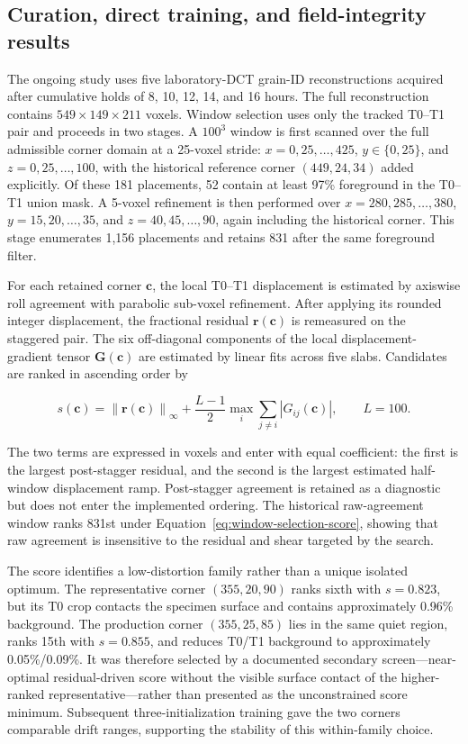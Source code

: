 \documentclass[proposalMode]{ufdissertation}
\begin{document}
\subsection{Curation, direct training, and field-integrity results}

The ongoing study uses five laboratory-DCT grain-ID reconstructions acquired after cumulative holds of 8, 10, 12, 14, and 16 hours. The full reconstruction contains \(549\times149\times211\) voxels. Window selection uses only the tracked T0--T1 pair and proceeds in two stages. A \(100^3\) window is first scanned over the full admissible corner domain at a 25-voxel stride: \(x=0,25,\ldots,425\), \(y\in\{0,25\}\), and \(z=0,25,\ldots,100\), with the historical reference corner \((449,24,34)\) added explicitly. Of these 181 placements, 52 contain at least 97\% foreground in the T0--T1 union mask. A 5-voxel refinement is then performed over \(x=280,285,\ldots,380\), \(y=15,20,\ldots,35\), and \(z=40,45,\ldots,90\), again including the historical corner. This stage enumerates 1,156 placements and retains 831 after the same foreground filter.

For each retained corner \(\mathbf{c}\), the local T0--T1 displacement is estimated by axiswise roll agreement with parabolic sub-voxel refinement. After applying its rounded integer displacement, the fractional residual \(\mathbf{r}(\mathbf{c})\) is remeasured on the staggered pair. The six off-diagonal components of the local displacement-gradient tensor \(\mathbf{G}(\mathbf{c})\) are estimated by linear fits across five slabs. Candidates are ranked in ascending order by

\begin{equation}
s(\mathbf{c})
=
\left\|\mathbf{r}(\mathbf{c})\right\|_{\infty}
+
\frac{L-1}{2}
\max_i\sum_{j\ne i}\left|G_{ij}(\mathbf{c})\right|,
\qquad L=100.
\label{eq:window-selection-score}
\end{equation}

The two terms are expressed in voxels and enter with equal coefficient: the first is the largest post-stagger residual, and the second is the largest estimated half-window displacement ramp. Post-stagger agreement is retained as a diagnostic but does not enter the implemented ordering. The historical raw-agreement window ranks 831st under Equation~\eqref{eq:window-selection-score}, showing that raw agreement is insensitive to the residual and shear targeted by the search.

The score identifies a low-distortion family rather than a unique isolated optimum. The representative corner \((355,20,90)\) ranks sixth with \(s=0.823\), but its T0 crop contacts the specimen surface and contains approximately 0.96\% background. The production corner \((355,25,85)\) lies in the same quiet region, ranks 15th with \(s=0.855\), and reduces T0/T1 background to approximately 0.05\%/0.09\%. It was therefore selected by a documented secondary screen---near-optimal residual-driven score without the visible surface contact of the higher-ranked representative---rather than presented as the unconstrained score minimum. Subsequent three-initialization training gave the two corners comparable drift ranges, supporting the stability of this within-family choice.
\end{document}
